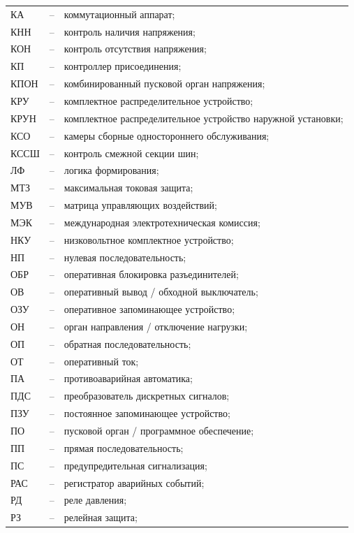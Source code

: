 \begin{longtable}{>{\raggedright\arraybackslash}m{2cm}>{\raggedright\arraybackslash}m{0.5cm}>{\raggedright\arraybackslash}m{20cm}}
КА & -- & коммутационный аппарат; \\
КНН & -- & контроль наличия напряжения; \\
КОН & -- & контроль отсутствия напряжения; \\
КП & -- & контроллер присоединения; \\
КПОН & -- & комбинированный пусковой орган напряжения; \\
КРУ & -- & комплектное распределительное устройство; \\
КРУН & -- & комплектное распределительное устройство наружной установки; \\
КСО & -- & камеры сборные одностороннего обслуживания; \\
КССШ & -- & контроль смежной секции шин; \\
ЛФ & -- & логика формирования; \\
МТЗ & -- & максимальная токовая защита; \\
МУВ & -- & матрица управляющих воздействий; \\
МЭК & -- & международная электротехническая комиссия; \\
НКУ & -- & низковольтное комплектное устройство; \\
НП & -- & нулевая последовательность; \\
ОБР & -- & оперативная блокировка разъединителей; \\
ОВ & -- & оперативный вывод / обходной выключатель; \\
ОЗУ & -- & оперативное запоминающее устройство; \\
ОН & -- & орган направления / отключение нагрузки; \\
ОП & -- & обратная последовательность; \\
ОТ & -- & оперативный ток; \\
ПА & -- & противоаварийная автоматика; \\
ПДС & -- & преобразователь дискретных сигналов; \\
ПЗУ & -- & постоянное запоминающее устройство; \\
ПО & -- & пусковой орган / программное обеспечение; \\
ПП & -- & прямая последовательность; \\
ПС & -- & предупредительная сигнализация; \\
РАС & -- & регистратор аварийных событий; \\
РД & -- & реле давления; \\
РЗ & -- & релейная защита; \\

\end{longtable}

